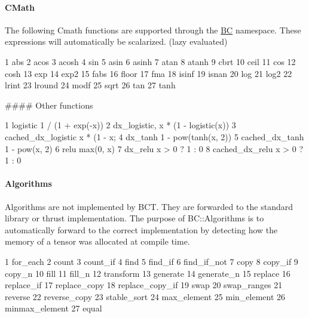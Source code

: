 \paragraph*{C\+Math}

The following Cmath functions are supported through the {\ttfamily \hyperlink{namespaceBC}{BC}} namespace. These expressions will automatically be scalarized. (lazy evaluated) 
\begin{DoxyCode}
1 abs
2 acos
3 acosh
4 sin
5 asin
6 asinh
7 atan
8 atanh
9 cbrt
10 ceil
11 cos
12 cosh
13 exp
14 exp2
15 fabs
16 floor
17 fma
18 isinf
19 isnan
20 log
21 log2
22 lrint
23 lround
24 modf
25 sqrt
26 tan
27 tanh
\end{DoxyCode}
 \#\#\#\# Other functions 
\begin{DoxyCode}
1 logistic              1 / (1 + exp(-x))
2 dx\_logistic,          x * (1 - logistic(x))
3 cached\_dx\_logistic    x * (1 - x;
4 dx\_tanh               1 - pow(tanh(x, 2))
5 cached\_dx\_tanh        1 - pow(x, 2)
6 relu                  max(0, x)
7 dx\_relu               x > 0 ? 1 : 0
8 cached\_dx\_relu        x > 0 ? 1 : 0
\end{DoxyCode}
 \paragraph*{Algorithms}

Algorithms are not implemented by B\+CT. They are forwarded to the standard library or thrust implementation. The purpose of B\+C\+::\+Algorithms is to automatically forward to the correct implementation by detecting how the memory of a tensor was allocated at compile time. 
\begin{DoxyCode}
1 for\_each
2 count
3 count\_if
4 find
5 find\_if
6 find\_if\_not
7 copy
8 copy\_if
9 copy\_n
10 fill
11 fill\_n
12 transform
13 generate
14 generate\_n
15 replace
16 replace\_if
17 replace\_copy
18 replace\_copy\_if
19 swap
20 swap\_ranges
21 reverse
22 reverse\_copy
23 stable\_sort
24 max\_element
25 min\_element
26 minmax\_element
27 equal
\end{DoxyCode}
 